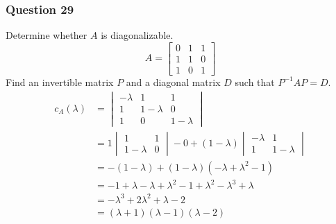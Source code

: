 \documentclass{math}
\begin{document}
\subsubsection*{Question 29}
Determine whether \( A \) is diagonalizable.
\[ A = \begin{bmatrix}
  0 & 1 & 1 \\
  1 & 1 & 0 \\
  1 & 0 & 1
\end{bmatrix} \]
Find an invertible matrix \( P \) and a diagonal matrix \( D \) such that
\( P^{-1}AP = D \).
\begin{align*}
  c_A(\lambda) &= \begin{vmatrix}
    -\lambda & 1 & 1 \\
    1 & 1-\lambda & 0 \\
    1 & 0 & 1-\lambda
  \end{vmatrix} \\
  &= 1\begin{vmatrix}
    1 & 1 \\
    1-\lambda & 0
  \end{vmatrix}-0+(1-\lambda)\begin{vmatrix}
    -\lambda & 1 \\
    1 & 1-\lambda
  \end{vmatrix} \\
  &= -(1-\lambda)+(1-\lambda)(-\lambda+\lambda^2-1) \\
  &= -1+\lambda-\lambda+\lambda^2-1+\lambda^2-\lambda^3+\lambda \\
  &= -\lambda^3+2\lambda^2+\lambda-2 \\
  &= (\lambda+1)(\lambda-1)(\lambda-2)
\end{align*}
\end{document}
